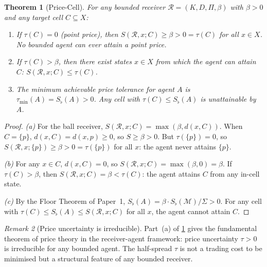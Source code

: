 \documentclass[twocolumn,11pt,a4paper]{article}
\newtheorem{theorem}{Theorem}[section]
\theoremstyle{remark}
\newtheorem{remark}[theorem]{Remark}
\newcommand{\Sflat}{S_{\flat}}
\newcommand{\Rec}{\mathcal{R}}
\newcommand{\Meth}{\mathcal{M}}
\newcommand{\tol}{\tau}
\begin{document}
\begin{theorem}[Price-Cell]
\label{thm:price-cell}
For any bounded receiver $\Rec = (K, D, \Pi, \beta)$ with $\beta > 0$ and
any target cell $C \subseteq X$:
\begin{enumerate}[label=\textup{(\alph*)}]
\item If $\tol(C) = 0$ (point price), then $S(\Rec, x; C) \ge \beta > 0 =
  \tol(C)$ for all $x \in X$.  No bounded agent can ever attain a point price.
\item If $\tol(C) > \beta$, then there exist states $x \in X$ from which
  the agent can attain $C$: $S(\Rec, x; C) \le \tol(C)$.
\item The minimum achievable price tolerance for agent $A$ is $\tol_{\min}(A)
  = \Sflat(A) > 0$.  Any cell with $\tol(C) \le \Sflat(A)$ is unattainable
  by $A$.
\end{enumerate}
\end{theorem}
\begin{proof}
\textit{(a)}  For the ball receiver, $S(\Rec, x; C) = \max(\beta, d(x,C))$.
When $C = \{p\}$, $d(x, C) = d(x, p) \ge 0$, so $S \ge \beta > 0$.
But $\tol(\{p\}) = 0$, so $S(\Rec, x; \{p\}) \ge \beta > 0 = \tol(\{p\})$
for all $x$: the agent never attains $\{p\}$.

\textit{(b)}  For any $x \in C$, $d(x,C) = 0$, so $S(\Rec, x; C) =
\max(\beta, 0) = \beta$.  If $\tol(C) > \beta$, then $S(\Rec, x; C) = \beta
< \tol(C)$: the agent attains $C$ from any in-cell state.

\textit{(c)}  By the Floor Theorem of Paper~1, $\Sflat(A) = \beta\cdot
\Sflat(\Meth)/\Sigma > 0$.  For any cell with $\tol(C) \le \Sflat(A) \le
S(\Rec, x; C)$ for all $x$, the agent cannot attain $C$.
\end{proof}

\begin{remark}[Price uncertainty is irreducible]
Part~(a) of \cref{thm:price-cell} gives the fundamental theorem of price
theory in the receiver-agent framework: price uncertainty $\tol > 0$ is
irreducible for any bounded agent.  The half-spread $\tol$ is not a trading
cost to be minimised but a structural feature of any bounded receiver.
\end{remark}
\end{document}
